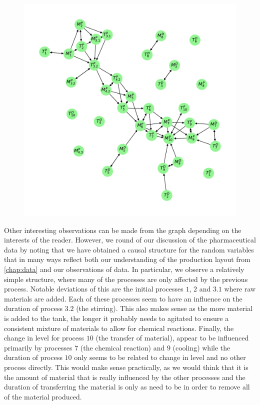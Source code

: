\documentclass[../Thesis.tex]{subfiles}
\begin{document}
\begin{figure}[ht]
    \centering
    \includegraphics[width = .75\linewidth]{figures/Cycle data/G_dir times and levelchanges as graph - directed - 0_09.pdf}
    \caption{}
    \label{fig:G_dir times and levelchanges - semidirected - as graph}
\end{figure}
Other interesting observations can be made from the graph depending on the interests of the reader. However, we round of our discussion of the pharmaceutical data by noting that we have obtained a causal structure for the random variables that in many ways reflect both our understanding of the production layout from \autoref{chap:data} and our observations of data. In particular, we observe a relatively simple structure, where many of the processes are only affected by the previous process. Notable deviations of this are the initial processes $1$, $2$ and $3.1$ where raw materials are added. Each of these processes seem to have an influence on the duration of process $3.2$ (the stirring). This also makes sense as the more material is added to the tank, the longer it probably needs to agitated to ensure a consistent mixture of materials to allow for chemical reactions. Finally, the change in level for process $10$ (the transfer of material), appear to be influenced primarily by processes $7$ (the chemical reaction) and $9$ (cooling) while the duration of process $10$ only seems to be related to change in level and no other process directly. This would make sense practically, as we would think that it is the amount of material that is really influenced by the other processes and the duration of transferring the material is only as need to be in order to remove all of the material produced.
\end{document}
